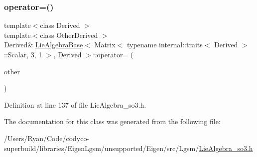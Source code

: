 \subsubsection{\texorpdfstring{operator=()}{operator=()}\hspace{0.1cm}{\footnotesize\ttfamily [4/4]}}
{\footnotesize\ttfamily template$<$class Derived $>$ \\
template$<$class Other\+Derived $>$ \\
Derived\& \hyperlink{class_lie_algebra_base}{Lie\+Algebra\+Base}$<$ Matrix$<$ typename internal\+::traits$<$ Derived $>$\+::Scalar, 3, 1 $>$, Derived $>$\+::operator= (\begin{DoxyParamCaption}\item[{const \hyperlink{class_lie_algebra_base}{Lie\+Algebra\+Base}$<$ \hyperlink{class_lie_algebra_base_3_01_matrix_3_01typename_01internal_1_1traits_3_01_derived_01_4_1_1_scalabfa0bdce6d9781ee940346c3f6d91f4e_a2191d421225a2c966825db324301abba}{Base\+Type}, Other\+Derived $>$ \&}]{other }\end{DoxyParamCaption})\hspace{0.3cm}{\ttfamily [inline]}}



Definition at line 137 of file Lie\+Algebra\+\_\+so3.\+h.



The documentation for this class was generated from the following file\+:\begin{DoxyCompactItemize}
\item 
/\+Users/\+Ryan/\+Code/codyco-\/superbuild/libraries/\+Eigen\+Lgsm/unsupported/\+Eigen/src/\+Lgsm/\hyperlink{_lie_algebra__so3_8h}{Lie\+Algebra\+\_\+so3.\+h}\end{DoxyCompactItemize}

